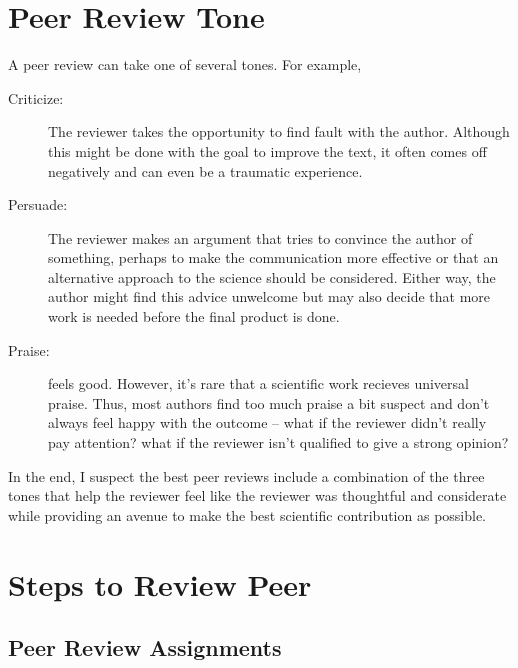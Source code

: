 \documentclass{tufte-handout}\usepackage[]{graphicx}\usepackage[]{color}
\begin{document}
\section{Peer Review Tone}

A peer review can take one of several tones. For example, 

\begin{description}
	\item[Criticize:] The reviewer takes the opportunity to find fault with the author. Although this might be done with the goal to improve the text, it often comes off negatively and can even be a traumatic experience. 
	\item[Persuade:] The reviewer makes an argument that tries to convince the author of something, perhaps to make the communication more effective or that an alternative approach to the science should be considered. Either way, the author might find this advice unwelcome but may also decide that more work is needed before the final product is done. 
	\item[Praise:] feels good. However, it's rare that a scientific work recieves universal praise. Thus, most authors find too much praise a bit suspect and don't always feel happy with the outcome -- what if the reviewer didn't really pay attention? what if the reviewer isn't qualified to give a strong opinion?  
\end{description}

In the end, I suspect the best peer reviews include a combination of the three tones that help the reviewer feel like the reviewer was thoughtful and considerate while providing an avenue to make the best scientific contribution as possible. 

\section{Steps to Review Peer}

\subsection{Peer Review Assignments}
\end{document}
